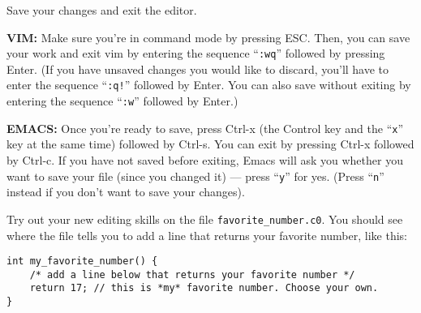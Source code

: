 \begin{part}
  Save your changes and exit the editor.

  \textbf{VIM:} Make sure you're in command mode by pressing ESC\@.
  Then, you can save your work and exit vim by entering the
  sequence ``\lstinline':wq''' followed by pressing Enter.
  (If you have unsaved changes you would like to discard,
  you'll have to enter the sequence ``\lstinline':q!''' followed by Enter.
  You can also save without exiting by entering the sequence
  ``\lstinline':w''' followed by Enter.)

  \textbf{EMACS:} Once you're ready to save, press Ctrl-x (the Control
  key and the ``\lstinline'x''' key at the same time) followed by
  Ctrl-s. You can exit by pressing Ctrl-x followed by Ctrl-c.  If you
  have not saved before exiting, Emacs will ask you whether you want
  to save your file (since you changed it) --- press ``\lstinline'y'''
  for yes. (Press ``\lstinline'n''' instead if you don't want to save
  your changes).

\end{part}

\begin{part}
Try out your new editing skills on the file \lstinline'favorite_number.c0'.
You should see where the file tells you to add a line that returns your
favorite number, like this:
\begin{lstlisting}[language={[coin]C}, belowskip=0pt]
int my_favorite_number() {
    /* add a line below that returns your favorite number */
    return 17; // this is *my* favorite number. Choose your own.
}
\end{lstlisting}
\end{part}
